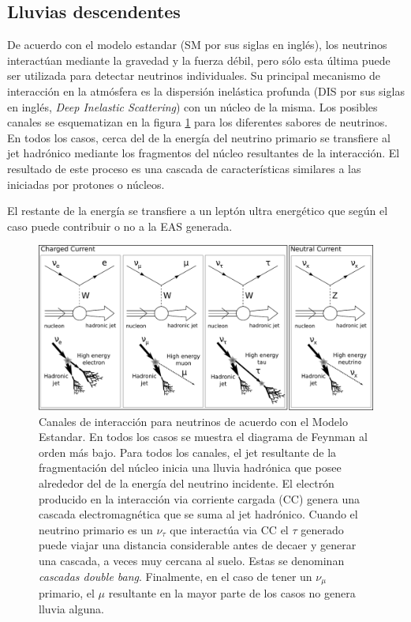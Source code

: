 \subsection{Lluvias descendentes}
\label{sbsc:easDG}

De acuerdo con el modelo estandar (SM por sus siglas en inglés), los neutrinos interactúan mediante la gravedad y la fuerza débil, pero sólo esta última puede ser utilizada para detectar neutrinos individuales.
Su principal mecanismo de interacción en la atmósfera es la dispersión inelástica profunda (DIS por sus siglas en inglés, \emph{Deep Inelastic Scattering}) con un n\'ucleo de la misma. Los posibles canales se esquematizan en la figura \ref{fig:SM_nu_int} para los diferentes sabores de neutrinos.
En todos los casos, cerca del  de la energía del neutrino primario se transfiere al jet hadrónico mediante los fragmentos del núcleo resultantes de la interacción.
El resultado de este proceso es una cascada de características similares a las iniciadas por protones o núcleos.

El  restante de la energía se transfiere a un leptón ultra energético que según el caso puede contribuir o no a la EAS generada.
%
\begin{figure}[ht]
\begin{center}
\includegraphics[width=1.0\textwidth]{fig/EASAuger/nu_channels_english.pdf}
\caption{Canales de interacción para neutrinos de acuerdo con el Modelo Estandar.
En todos los casos se muestra el diagrama de Feynman al orden más bajo.
Para todos los canales, el jet resultante de la fragmentación del núcleo inicia una lluvia hadrónica que posee alrededor del  de la energía del neutrino incidente.
El electrón producido en la interacción via corriente cargada (CC) genera una cascada electromagnética que se suma al jet hadrónico.
Cuando el neutrino primario es un $\nu_{\tau}$ que interact\'ua via CC el $\tau$ generado puede viajar una distancia considerable antes de decaer y generar una cascada, a veces muy cercana al suelo.
Estas se denominan \emph{cascadas double bang}.
Finalmente, en el caso de tener un $\nu_{\mu}$ primario, el $\mu$ resultante en la mayor parte de los casos no genera lluvia alguna.
}
\label{fig:SM_nu_int}
\end{center}
\end{figure}

